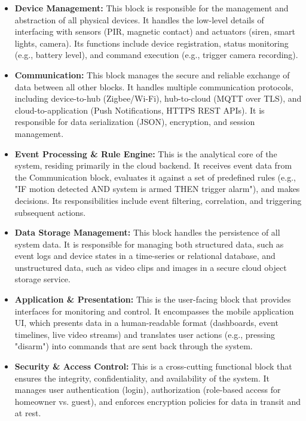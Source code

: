 \documentclass[conference]{IEEEtran}
\begin{document}
\begin{itemize}
    \item \textbf{Device Management:} This block is responsible for the management and abstraction of all physical devices. It handles the low-level details of interfacing with sensors (PIR, magnetic contact) and actuators (siren, smart lights, camera). Its functions include device registration, status monitoring (e.g., battery level), and command execution (e.g., trigger camera recording).

    \item \textbf{Communication:} This block manages the secure and reliable exchange of data between all other blocks. It handles multiple communication protocols, including device-to-hub (Zigbee/Wi-Fi), hub-to-cloud (MQTT over TLS), and cloud-to-application (Push Notifications, HTTPS REST APIs). It is responsible for data serialization (JSON), encryption, and session management.

    \item \textbf{Event Processing \& Rule Engine:} This is the analytical core of the system, residing primarily in the cloud backend. It receives event data from the Communication block, evaluates it against a set of predefined rules (e.g., "IF motion detected AND system is armed THEN trigger alarm"), and makes decisions. Its responsibilities include event filtering, correlation, and triggering subsequent actions.

    \item \textbf{Data Storage Management:} This block handles the persistence of all system data. It is responsible for managing both structured data, such as event logs and device states in a time-series or relational database, and unstructured data, such as video clips and images in a secure cloud object storage service.

    \item \textbf{Application \& Presentation:} This is the user-facing block that provides interfaces for monitoring and control. It encompasses the mobile application UI, which presents data in a human-readable format (dashboards, event timelines, live video streams) and translates user actions (e.g., pressing "disarm") into commands that are sent back through the system.

    \item \textbf{Security \& Access Control:} This is a cross-cutting functional block that ensures the integrity, confidentiality, and availability of the system. It manages user authentication (login), authorization (role-based access for homeowner vs. guest), and enforces encryption policies for data in transit and at rest.
\end{itemize}
\end{document}
